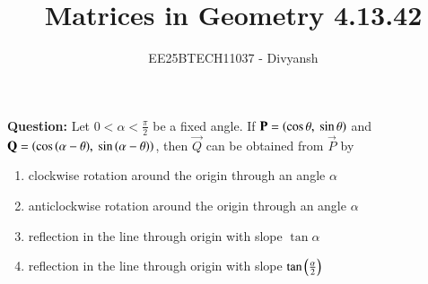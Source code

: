 \documentclass[journal,12pt,onecolumn]{IEEEtran}
\title{Matrices in Geometry 4.13.42}
\author{EE25BTECH11037 - Divyansh}
\theoremstyle{remark}
\begin{document}
\vspace{3cm}
\maketitle
{\let\newpage\relax\maketitle}
\textbf{Question: }
Let $0<\alpha<\frac{\pi}{2}$ be a fixed angle. If $\mathbf{P}=\left(\cos{\theta},\  \sin{\theta}\right)$ and $\mathbf{Q} = \left(\cos{\ensuremath{\left(\alpha - \theta\right)}}, \ \sin{\ensuremath{\left(\alpha - \theta\right)}}\right)$, then $\vec{Q}$ can be obtained from $\vec{P}$ by
\begin{enumerate}[label=(\alph*)]
    \item clockwise rotation around the origin through an angle $\alpha$
    \item anticlockwise rotation around the origin through an angle $\alpha$
    \item reflection in the line through origin with slope $\tan\alpha$
    \item reflection in the line through origin with slope $\tan\left(\frac{\alpha}{2}\right)$
\end{enumerate}

\vspace{2mm}
\end{document}

